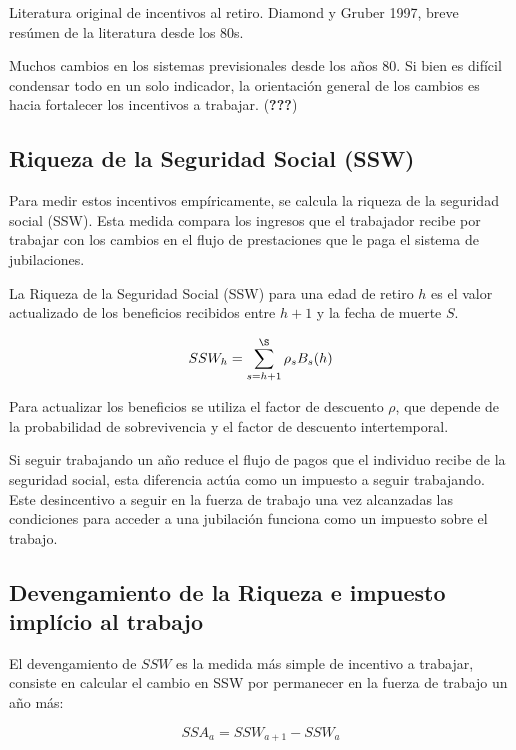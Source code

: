 \documentclass[]{article}
\begin{document}
Literatura original de incentivos al retiro. Diamond y Gruber 1997,
breve resúmen de la literatura desde los 80s.

Muchos cambios en los sistemas previsionales desde los años 80. Si bien
es difícil condensar todo en un solo indicador, la orientación general
de los cambios es hacia fortalecer los incentivos a trabajar.
({\textbf{???}})

\hypertarget{riqueza-de-la-seguridad-social-ssw}{%
\subsection{Riqueza de la Seguridad Social
(SSW)}\label{riqueza-de-la-seguridad-social-ssw}}

Para medir estos incentivos empíricamente, se calcula la riqueza de la
seguridad social (SSW). Esta medida compara los ingresos que el
trabajador recibe por trabajar con los cambios en el flujo de
prestaciones que le paga el sistema de jubilaciones.

La Riqueza de la Seguridad Social (SSW) para una edad de retiro \(h\) es
el valor actualizado de los beneficios recibidos entre \(h + 1\) y la
fecha de muerte \(S\).

\[ SSW_{h} = \sum_{s=h+1}^{\S} \rho_{s} B_{s}(h)\]

Para actualizar los beneficios se utiliza el factor de descuento
\(\rho\), que depende de la probabilidad de sobrevivencia y el factor de
descuento intertemporal.

Si seguir trabajando un año reduce el flujo de pagos que el individuo
recibe de la seguridad social, esta diferencia actúa como un impuesto a
seguir trabajando. Este desincentivo a seguir en la fuerza de trabajo
una vez alcanzadas las condiciones para acceder a una jubilación
funciona como un impuesto sobre el trabajo.

\hypertarget{devengamiento-de-la-riqueza-e-impuesto-impluxedcio-al-trabajo}{%
\subsection{Devengamiento de la Riqueza e impuesto implício al
trabajo}\label{devengamiento-de-la-riqueza-e-impuesto-impluxedcio-al-trabajo}}

El devengamiento de \(SSW\) es la medida más simple de incentivo a
trabajar, consiste en calcular el cambio en SSW por permanecer en la
fuerza de trabajo un año más:

\[ SSA_{a} = SSW_{a+1} - SSW_{a}\]
\end{document}
